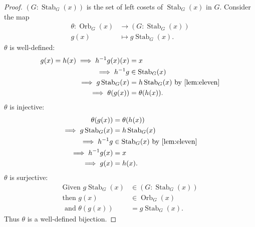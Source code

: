 \begin{proof}
    $(G : \operatorname{Stab}_G(x))$ is the set of left cosets of $\operatorname{Stab}_G(x)$ in $G$.
    Consider the map 
    \begin{align*}
        \theta : \operatorname{Orb}_G(x) &\to (G : \operatorname{Stab}_G(x)) \\
        g(x) &\mapsto g \operatorname{Stab}_G(x).
    \end{align*}  
    $\theta$ is well-defined: 
    \begin{align*}
        g(x) = h(x) \implies h^{-1}g(x) (x) &= x \\
        \implies h^{-1}g &\in \operatorname{Stab}_G(x) \\
        \implies g \operatorname{Stab}_G(x) &= h \operatorname{Stab}_G(x) \text{ by \Cref{lem:eleven}} \\
        \implies \theta(g(x)) &= \theta(h(x)).
    \end{align*} 
    $\theta$ is injective: 
    \begin{align*}
        \theta(g(x)) &= \theta(h(x)) \\
        \implies g \operatorname{Stab}_G(x) &= h \operatorname{Stab}_G(x) \\
        \implies h^{-1}g &\in \operatorname{Stab}_G(x) \text{ by \Cref{lem:eleven}} \\
        \implies h^{-1}g(x) &= x \\
        \implies g(x) &= h(x).
    \end{align*}
    $\theta$ is surjective:
    \begin{align*}
        \text{Given } g \operatorname{Stab}_G(x) &\in (G : \operatorname{Stab}_G(x)) \\
        \text{then } g(x) &\in \operatorname{Orb}_G(x) \\
        \text{ and } \theta(g(x)) &= g \operatorname{Stab}_G(x).
    \end{align*} 
    Thus $\theta$ is a well-defined bijection.
\end{proof} 
